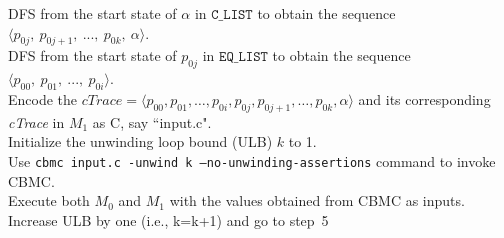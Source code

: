 \begin{algorithm}[!t]
\scriptsize
 DFS from the start state of $\alpha$ in $\mathtt{C\_LIST}$ to obtain the 
 sequence  $\langle p_{0j},~p_{0j+1},~...,~p_{0k},~\alpha\rangle$.\label{Line:ctraceM0}\\
 DFS from the start state of $p_{0j}$ in $\mathtt{EQ\_LIST}$ to obtain the sequence 
 $\langle p_{00},~p_{01},~...,~p_{0i}\rangle$.\label{Line:ctraceM1}\\
 Encode the $\mathit{cTrace}=\langle 
 p_{00},p_{01},\dots,p_{0i},p_{0j},p_{0j+1},\dots,p_{0k},\alpha\rangle$ 
 and its corresponding \textit{cTrace} in $M_1$ as C, say ``input.c".\label{Line:encode}\\
 Initialize the unwinding loop bound (ULB) $k$ to 1.\\
 Use \texttt{cbmc input.c -unwind k --no-unwinding-assertions} command to 
 invoke  CBMC.\\
  {{}}
 {{}}
  {{}}
  {Execute both $M_0$ and $M_1$ with the values obtained from CBMC as inputs.\\
 {{}}
     \Else
  {{}}
    }  
  {{}}
 \Else
  { Increase ULB by one (i.e., k=k+1) and go to step~5}
 \caption{$\mathtt{counterExmapleGenerator}$($M_0$, $M_1$, $\alpha$,  $\beta$, 
 $\mathtt{EQ\_LIST, C\_LIST}$)}
 \label{Algo:ctrace}
 \end{algorithm}

